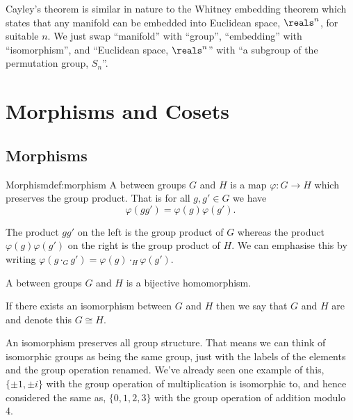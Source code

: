 \documentclass[fleqn]{NotesClass}
\newcommand*{\isomorphic}{\cong}
\begin{document}
    Cayley's theorem is similar in nature to the Whitney embedding theorem which states that any manifold can be embedded into Euclidean space, \(\reals^n\), for suitable \(n\).
    We just swap \enquote{manifold} with \enquote{group}, \enquote{embedding} with \enquote{isomorphism}, and \enquote{Euclidean space, \(\reals^n\)} with \enquote{a subgroup of the permutation group, \(S_n\)}.
    
    
    \chapter{Morphisms and Cosets}
    \section{Morphisms}
    \begin{dfn}{Morphism}{def:morphism}
        A  between groups \(G\) and \(H\) is a map \(\varphi\colon G \to H\) which preserves the group product.
        That is for all \(g, g' \in G\) we have
        \begin{equation}
            \varphi(gg') = \varphi(g)\varphi(g').
        \end{equation}
        \begin{rmk}
            The product \(gg'\) on the left is the group product of \(G\) whereas the product \(\varphi(g)\varphi(g')\) on the right is the group product of \(H\).
            We can emphasise this by writing \(\varphi(g \cdot_G g') = \varphi(g) \cdot_H \varphi(g')\).
        \end{rmk}
        
        A  between groups \(G\) and \(H\) is a bijective homomorphism.
        
        If there exists an isomorphism between \(G\) and \(H\) then we say that \(G\) and \(H\) are  and denote this \(G \isomorphic H\).
    \end{dfn}
    
    An isomorphism preserves all group structure.
    That means we can think of isomorphic groups as being the same group, just with the labels of the elements and the group operation renamed.
    We've already seen one example of this, \(\{\pm 1, \pm i\}\) with the group operation of multiplication is isomorphic to, and hence considered the same as, \(\{0, 1, 2, 3\}\) with the group operation of addition modulo 4.
    
\end{document}

